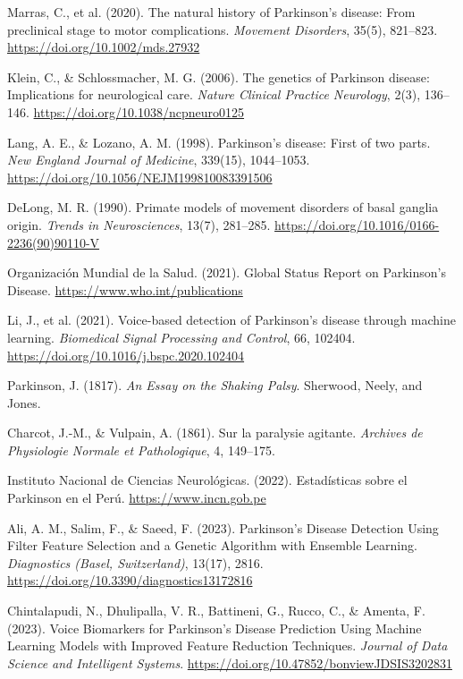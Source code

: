 \documentclass[listof=nochaptergap,12pt,times,authoryear]{report}
\begin{document}
\begin{thebibliography}{99}

Marras, C., et al. (2020). The natural history of Parkinson's disease: From preclinical stage to motor complications. \textit{Movement Disorders}, 35(5), 821--823. \url{https://doi.org/10.1002/mds.27932}

Klein, C., \& Schlossmacher, M. G. (2006). The genetics of Parkinson disease: Implications for neurological care. \textit{Nature Clinical Practice Neurology}, 2(3), 136--146. \url{https://doi.org/10.1038/ncpneuro0125}

Lang, A. E., \& Lozano, A. M. (1998). Parkinson’s disease: First of two parts. \textit{New England Journal of Medicine}, 339(15), 1044--1053. \url{https://doi.org/10.1056/NEJM199810083391506}

DeLong, M. R. (1990). Primate models of movement disorders of basal ganglia origin. \textit{Trends in Neurosciences}, 13(7), 281--285. \url{https://doi.org/10.1016/0166-2236(90)90110-V}

Organización Mundial de la Salud. (2021). Global Status Report on Parkinson’s Disease. \url{https://www.who.int/publications}

Li, J., et al. (2021). Voice-based detection of Parkinson's disease through machine learning. \textit{Biomedical Signal Processing and Control}, 66, 102404. \url{https://doi.org/10.1016/j.bspc.2020.102404}

Parkinson, J. (1817). \textit{An Essay on the Shaking Palsy}. Sherwood, Neely, and Jones.

Charcot, J.-M., \& Vulpain, A. (1861). Sur la paralysie agitante. \textit{Archives de Physiologie Normale et Pathologique}, 4, 149--175.

Instituto Nacional de Ciencias Neurológicas. (2022). Estadísticas sobre el Parkinson en el Perú. \url{https://www.incn.gob.pe}

Ali, A. M., Salim, F., \& Saeed, F. (2023). Parkinson's Disease Detection Using Filter Feature Selection and a Genetic Algorithm with Ensemble Learning. \textit{Diagnostics (Basel, Switzerland)}, 13(17), 2816. \url{https://doi.org/10.3390/diagnostics13172816}

Chintalapudi, N., Dhulipalla, V. R., Battineni, G., Rucco, C., \& Amenta, F. (2023). Voice Biomarkers for Parkinson’s Disease Prediction Using Machine Learning Models with Improved Feature Reduction Techniques. \textit{Journal of Data Science and Intelligent Systems}. \url{https://doi.org/10.47852/bonviewJDSIS3202831}


\end{thebibliography}
\end{document}
